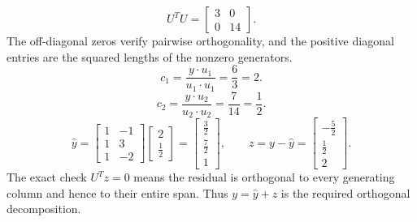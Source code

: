 \[U^TU=\left[\begin{array}{rr}3&0\\0&14\end{array}\right].\]
The off-diagonal zeros verify pairwise orthogonality, and the positive diagonal entries are the squared lengths of the nonzero generators.
\[c_{1}=\frac{y\cdot u_{1}}{u_{1}\cdot u_{1}}=\frac{6}{3}=2.\]
\[c_{2}=\frac{y\cdot u_{2}}{u_{2}\cdot u_{2}}=\frac{7}{14}=\frac{1}{2}.\]
\[\widehat y=\left[\begin{array}{rr}1&-1\\1&3\\1&-2\end{array}\right]\left[\begin{array}{r}2\\\frac{1}{2}\end{array}\right]=\left[\begin{array}{r}\frac{3}{2}\\\frac{7}{2}\\1\end{array}\right],\qquad z=y-\widehat y=\left[\begin{array}{r}- \frac{5}{2}\\\frac{1}{2}\\2\end{array}\right].\]
The exact check $U^Tz=0$ means the residual is orthogonal to every generating column and hence to their entire span. Thus $y=\widehat y+z$ is the required orthogonal decomposition.


